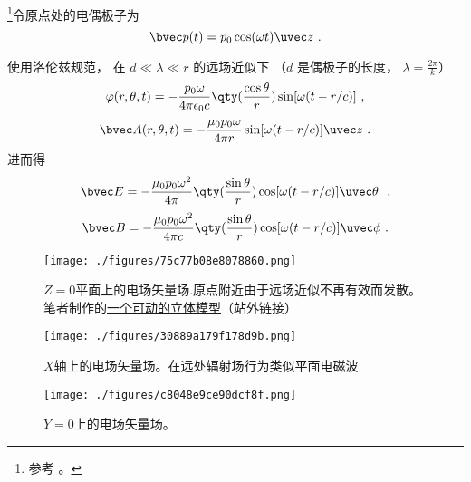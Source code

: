 
\begin{issues}
\issueDraft
\end{issues}


\footnote{参考 \cite{GriffE}。}令原点处的电偶极子为
\begin{equation}
\bvec p(t) = p_0 \cos(\omega t) \uvec z~.
\end{equation}

使用洛伦兹规范， 在 $d \ll \lambda \ll r$ 的远场近似下 （$d$ 是偶极子的长度， $\lambda = \frac{2\pi}{k}$）
\begin{equation}
\varphi(r, \theta, t) = -\frac{p_0\omega}{4\pi\epsilon_0 c} \qty(\frac{\cos\theta}{r}) \sin[\omega(t - r/c)]~,
\end{equation}
\begin{equation}
\bvec A(r, \theta, t) = -\frac{\mu_0 p_0 \omega}{4\pi r} \sin[\omega(t - r/c)]\uvec z~.
\end{equation}
进而得
\begin{equation}
\bvec E = -\frac{\mu_0 p_0\omega^2}{4\pi} \qty(\frac{\sin\theta}{r})\cos[\omega(t - r/c)]\uvec \theta~~,
\end{equation}
\begin{equation}
\bvec B = -\frac{\mu_0 p_0\omega^2}{4\pi c} \qty(\frac{\sin\theta}{r})\cos[\omega(t - r/c)]\uvec \phi~.
\end{equation}

\begin{figure}[ht]
\centering
\texttt{[image: ./figures/75c77b08e8078860.png]}
\caption{$Z=0$平面上的电场矢量场.原点附近由于远场近似不再有效而发散。笔者制作的\href{https://www.geogebra.org/m/xnputtwr}{一个可动的立体模型}（站外链接）} \label{fig_DipRad_4}
\end{figure}

\begin{figure}[ht]
\centering
\texttt{[image: ./figures/30889a179f178d9b.png]}
\caption{$X$轴上的电场矢量场。在远处辐射场行为类似平面电磁波 } \label{fig_DipRad_1}
\end{figure}

\begin{figure}[ht]
\centering
\texttt{[image: ./figures/c8048e9ce90dcf8f.png]}
\caption{$Y=0$上的电场矢量场。} \label{fig_DipRad_3}
\end{figure}
